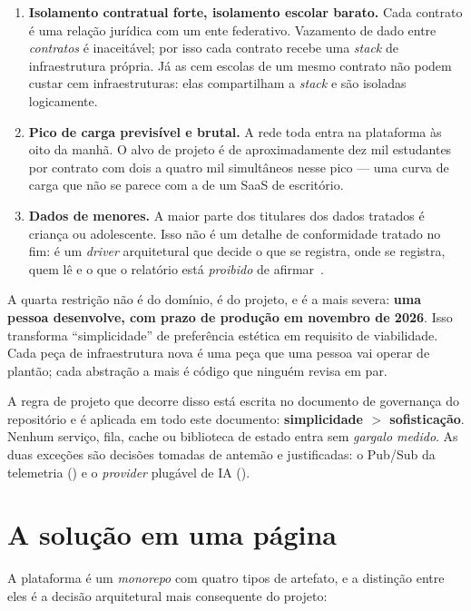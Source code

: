 \begin{enumerate}
  \item \textbf{Isolamento contratual forte, isolamento escolar barato.} Cada
    contrato é uma relação jurídica com um ente federativo. Vazamento de dado
    entre \emph{contratos} é inaceitável; por isso cada contrato recebe uma
    \emph{stack} de infraestrutura própria. Já as cem escolas de um mesmo
    contrato não podem custar cem infraestruturas: elas compartilham a
    \emph{stack} e são isoladas logicamente.
  \item \textbf{Pico de carga previsível e brutal.} A rede toda entra na
    plataforma às oito da manhã. O alvo de projeto é de aproximadamente dez mil
    estudantes por contrato com dois a quatro mil simultâneos nesse pico --- uma
    curva de carga que não se parece com a de um SaaS de escritório.
  \item \textbf{Dados de menores.} A maior parte dos titulares dos dados
    tratados é criança ou adolescente. Isso não é um detalhe de conformidade
    tratado no fim: é um \emph{driver} arquitetural que decide o que se registra,
    onde se registra, quem lê e o que o relatório está \emph{proibido} de
    afirmar~\cite{lgpd2018,anpdcriancas2024}.
\end{enumerate}

A quarta restrição não é do domínio, é do projeto, e é a mais severa:
\textbf{uma pessoa desenvolve, com prazo de produção em novembro de 2026}. Isso
transforma \enquote{simplicidade} de preferência estética em requisito de
viabilidade. Cada peça de infraestrutura nova é uma peça que uma pessoa vai
operar de plantão; cada abstração a mais é código que ninguém revisa em par.

\begin{decisao}
A regra de projeto que decorre disso está escrita no documento de governança do
repositório e é aplicada em todo este documento: \textbf{simplicidade $>$
sofisticação}. Nenhum serviço, fila, cache ou biblioteca de estado entra sem
\emph{gargalo medido}. As duas exceções são decisões tomadas de antemão e
justificadas: o Pub/Sub da telemetria () e o \emph{provider}
plugável de IA ().
\end{decisao}

\section{A solução em uma página}

A plataforma é um \emph{monorepo} com quatro tipos de artefato, e a distinção
entre eles é a decisão arquitetural mais consequente do projeto:

